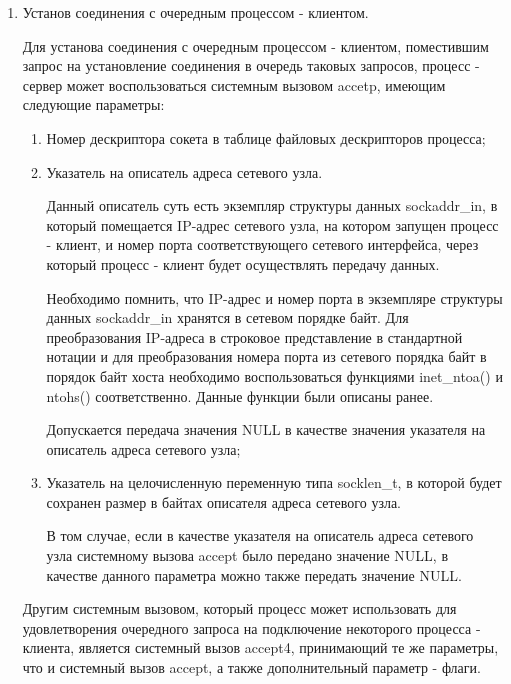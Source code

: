 \begin{enumerate}
		\item Установ соединения с очередным процессом - клиентом.

			Для установа соединения с очередным процессом - клиентом, поместившим запрос на установление соединения в очередь таковых запросов,
			процесс - сервер может воспользоваться системным вызовом accetp, имеющим следующие параметры:

				\begin{enumerate}

					\item Номер дескриптора сокета в таблице файловых дескрипторов процесса;
					\item Указатель на описатель адреса сетевого узла.

						Данный описатель суть есть экземпляр структуры данных sockaddr\_in, в который помещается
						IP-адрес сетевого узла, на котором запущен процесс - клиент, и номер порта соответствующего
						сетевого интерфейса, через который процесс - клиент будет осуществлять передачу данных.

						Необходимо помнить, что IP-адрес и номер порта в экземпляре структуры данных sockaddr\_in
						хранятся в сетевом порядке байт. Для преобразования IP-адреса в строковое представление в
						стандартной нотации и для преобразования номера порта из сетевого порядка байт в порядок байт
						хоста необходимо воспользоваться функциями inet\_ntoa() и ntohs() соответственно. Данные функции
						были описаны ранее.

						Допускается передача значения NULL в качестве значения указателя на описатель адреса сетевого узла;

					\item Указатель на целочисленную переменную типа socklen\_t, в которой будет сохранен размер в байтах описателя адреса сетевого узла.

						В том случае, если в качестве указателя на описатель адреса сетевого узла системному вызова accept было передано значение NULL,
						в качестве данного параметра можно также передать значение NULL.

				\end{enumerate}

			Другим системным вызовом, который процесс может использовать для удовлетворения очередного запроса на подключение некоторого процесса - клиента,
			является системный вызов accept4, принимающий те же параметры, что и системный вызов accept, а также дополнительный параметр - флаги.


\end{enumerate}
